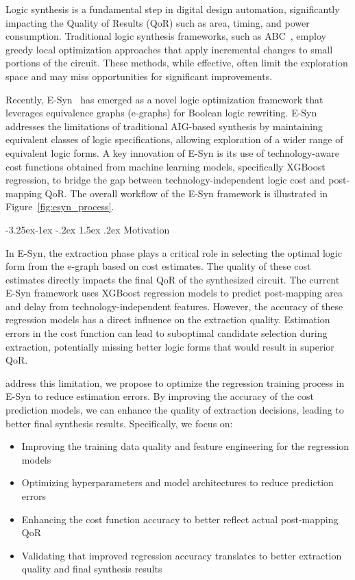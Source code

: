 \documentclass[10pt,twocolumn]{article}
\makeatletter
\renewcommand\subsection{\@startsection{subsection}{2}{\z@}%
                                     {-3.25ex\@plus -1ex \@minus -.2ex}%
                                     {1.5ex \@plus .2ex}%
                                     {\normalfont\normalsize\bfseries}}
\makeatother
\begin{document}
Logic synthesis is a fundamental step in digital design automation, significantly impacting the Quality of Results (QoR) such as area, timing, and power consumption. Traditional logic synthesis frameworks, such as ABC~\cite{b3}, employ greedy local optimization approaches that apply incremental changes to small portions of the circuit. These methods, while effective, often limit the exploration space and may miss opportunities for significant improvements.

Recently, E-Syn~\cite{esyn} has emerged as a novel logic optimization framework that leverages equivalence graphs (e-graphs) for Boolean logic rewriting. E-Syn addresses the limitations of traditional AIG-based synthesis by maintaining equivalent classes of logic specifications, allowing exploration of a wider range of equivalent logic forms. A key innovation of E-Syn is its use of technology-aware cost functions obtained from machine learning models, specifically XGBoost regression, to bridge the gap between technology-independent logic cost and post-mapping QoR. The overall workflow of the E-Syn framework is illustrated in Figure~\ref{fig:esyn_process}.

\subsection{Motivation}

In E-Syn, the extraction phase plays a critical role in selecting the optimal logic form from the e-graph based on cost estimates. The quality of these cost estimates directly impacts the final QoR of the synthesized circuit. The current E-Syn framework uses XGBoost regression models to predict post-mapping area and delay from technology-independent features. However, the accuracy of these regression models has a direct influence on the extraction quality. Estimation errors in the cost function can lead to suboptimal candidate selection during extraction, potentially missing better logic forms that would result in superior QoR.

 address this limitation, we propose to optimize the regression training process in E-Syn to reduce estimation errors. By improving the accuracy of the cost prediction models, we can enhance the quality of extraction decisions, leading to better final synthesis results. Specifically, we focus on:

\begin{itemize}
\item Improving the training data quality and feature engineering for the regression models
\item Optimizing hyperparameters and model architectures to reduce prediction errors
\item Enhancing the cost function accuracy to better reflect actual post-mapping QoR
\item Validating that improved regression accuracy translates to better extraction quality and final synthesis results
\end{itemize}
\end{document}
